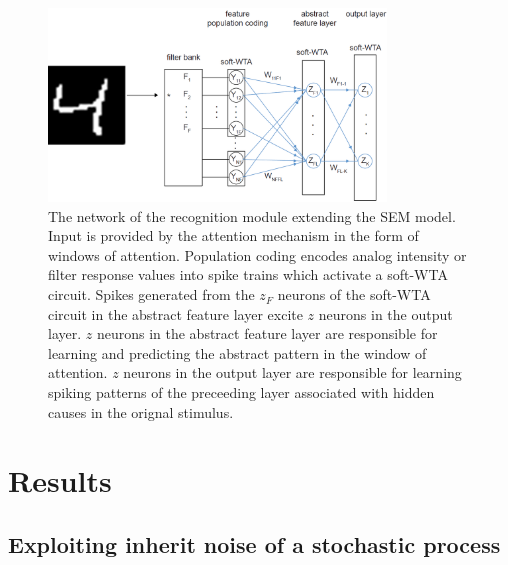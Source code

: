 \documentclass{report}
\begin{document}
\begin{figure}[ht]
\centering
\includegraphics[width=0.8\textwidth]{network}
\caption{The network of the recognition module extending the SEM model. Input is provided by the attention mechanism in the form of windows of attention. Population coding encodes analog intensity or filter response values into spike trains which activate a soft-WTA circuit. Spikes generated from the $z_F$ neurons of the soft-WTA circuit in the abstract feature layer excite $z$ neurons in the output layer. $z$ neurons in the abstract feature layer are responsible for learning and predicting the abstract pattern in the window of attention. $z$ neurons in the output layer are responsible for learning spiking patterns of the preceeding layer associated with hidden causes in the orignal stimulus.
\label{fig:network}}
\end{figure}

\chapter{Results}

\section{Exploiting inherit noise of a stochastic process}
\end{document}
